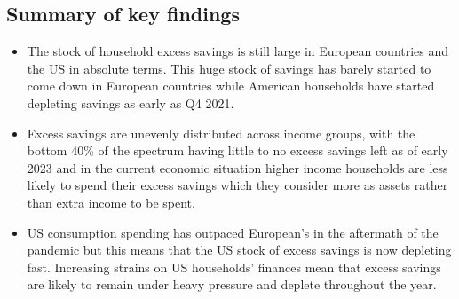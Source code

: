 \subsection{Summary of key findings}
\begin{itemize}
    \item The stock of household excess savings is still large in European countries and the US in absolute terms. This huge stock of savings has barely started to come down in European countries while American households have started depleting savings as early as Q4 2021. 
    \item Excess savings are unevenly distributed across income groups, with the bottom 40\% of the spectrum having little to no excess savings left as of early 2023 and in the current economic situation higher income households are less likely to spend their excess savings which they consider more as assets rather than extra income to be spent.
    \item US consumption spending has outpaced European’s in the aftermath of the pandemic but this means that the US stock of excess savings is now depleting fast. Increasing strains on US households’ finances mean that excess savings are likely to remain under heavy pressure and deplete throughout the year.
\end{itemize}